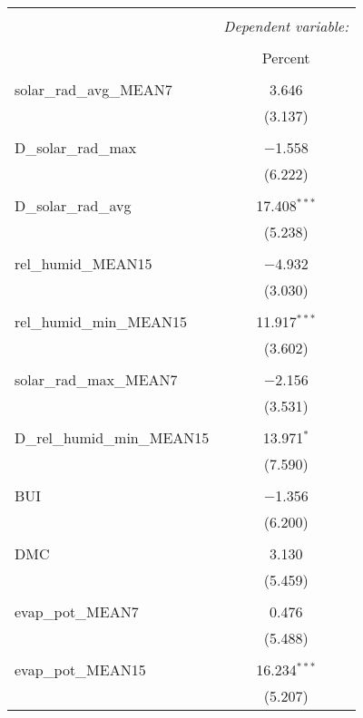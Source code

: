 
\begin{table}[!htbp] \centering 
  \caption{} 
  \label{} 
\begin{tabular}{@{\extracolsep{5pt}}lc} 
\\[-1.8ex]\hline 
\hline \\[-1.8ex] 
 & \multicolumn{1}{c}{\textit{Dependent variable:}} \\ 
\cline{2-2} 
\\[-1.8ex] & Percent \\ 
\hline \\[-1.8ex] 
 solar\_rad\_avg\_MEAN7 & 3.646 \\ 
  & (3.137) \\ 
  & \\ 
 D\_solar\_rad\_max & $-$1.558 \\ 
  & (6.222) \\ 
  & \\ 
 D\_solar\_rad\_avg & 17.408$^{***}$ \\ 
  & (5.238) \\ 
  & \\ 
 rel\_humid\_MEAN15 & $-$4.932 \\ 
  & (3.030) \\ 
  & \\ 
 rel\_humid\_min\_MEAN15 & 11.917$^{***}$ \\ 
  & (3.602) \\ 
  & \\ 
 solar\_rad\_max\_MEAN7 & $-$2.156 \\ 
  & (3.531) \\ 
  & \\ 
 D\_rel\_humid\_min\_MEAN15 & 13.971$^{*}$ \\ 
  & (7.590) \\ 
  & \\ 
 BUI & $-$1.356 \\ 
  & (6.200) \\ 
  & \\ 
 DMC & 3.130 \\ 
  & (5.459) \\ 
  & \\ 
 evap\_pot\_MEAN7 & 0.476 \\ 
  & (5.488) \\ 
  & \\ 
 evap\_pot\_MEAN15 & 16.234$^{***}$ \\ 
  & (5.207) \\ 

\end{tabular}
\end{table}
